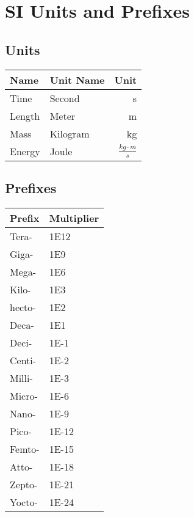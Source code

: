 
\label{app:SI}
\chapter{SI Units and Prefixes}

\section{Units}

\begin{tabular}{l l r}
Name 	& Unit Name & Unit 		\\ \hline
Time 	& Second 	& s			\\
Length 	& Meter 	& m			\\
Mass	& Kilogram	& kg		\\
Energy	& Joule		& $\frac{kg\cdot{}m}{s}$
\end{tabular}

\section{Prefixes}

\begin{tabular}{l | l}
	Prefix 	& Multiplier	\\ \hline
	Tera- 	& 1E12 			\\
	Giga- 	& 1E9 			\\
	Mega- 	& 1E6 			\\
	Kilo- 	& 1E3 			\\
	hecto-	& 1E2			\\
	Deca- 	& 1E1 			\\
	Deci-	& 1E-1 			\\
	Centi- 	& 1E-2 			\\
	Milli- 	& 1E-3 			\\
	Micro-	& 1E-6 			\\
	Nano- 	& 1E-9 			\\
	Pico- 	& 1E-12 		\\
	Femto- 	& 1E-15 		\\
	Atto- 	& 1E-18 		\\
	Zepto- 	& 1E-21 		\\
	Yocto- 	& 1E-24
\end{tabular}